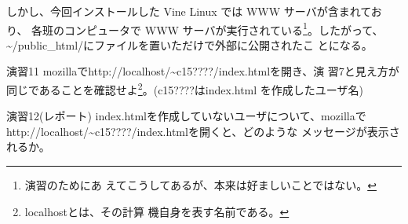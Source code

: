 \documentclass[a4j,10pt]{jarticle}
\begin{document}
しかし、今回インストールした Vine Linux では WWW サーバが含まれており、
各班のコンピュータで WWW サーバが実行されている\footnote{演習のためにあ
えてこうしてあるが、本来は好ましいことではない。}。したがって、
{\sffamily \~{}/public\_html/}にファイルを置いただけで外部に公開されたこ
とになる。

\begin{itembox}{演習11}
 mozillaで{\sffamily http://localhost/\~{}c15????/index.html}を開き、演
 習7と見え方が同じであることを確認せよ\footnote{localhostとは、その計算
 機自身を表す名前である。}。({\sffamily c15????}は{\sffamily index.html}
 を作成したユーザ名)
\end{itembox}
\begin{itembox}{演習12(レポート)}
 {\sffamily index.html}を作成していないユーザについて、mozillaで
 {\sffamily http://localhost/\~{}c15????/index.html}を開くと、どのような
 メッセージが表示されるか。
\end{itembox}
\end{document}
